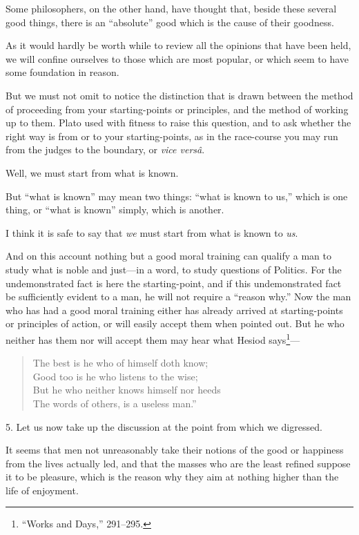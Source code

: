 Some philosophers, on the other hand, have thought that, beside these
several good things, there is an ``absolute'' good which is the cause
of their goodness.

As it would hardly be worth while to review all the opinions that have
been held, we will confine ourselves to those which are most popular,
or which seem to have some foundation in reason.

But we must not omit to notice the distinction that is drawn
between the method of proceeding from your starting-points or
principles, and the method of working up to them. Plato used with
fitness to raise this question, and to ask whether the right way is
from or to your starting-points, as in the race-course you may run
from the judges to the boundary, or \textit{vice vers\^a}.

Well, we must start from what is known.

But ``what is known'' may mean two things: ``what is known to us,''
which is one thing, or ``what is known'' simply, which is another.

I think it is safe to say that \textit{we} must start from what is
known to \textit{us}.

And on this account nothing but a good moral training can qualify a
man to study what is noble and just---in a word, to study questions of
Politics. For the undemonstrated fact is here the starting-point, and
if this undemonstrated fact be sufficiently evident to a man, he will
not require a ``reason why.'' Now the man who has had a good moral
training either has already arrived at starting-points or principles
of action, or will easily accept them when pointed out. But he who
neither has them nor will accept them may hear what Hesiod
says\footnote{``Works and Days,'' 291--295.}---

\begin{verse}
The best is he who of himself doth know;\\
Good too is he who listens to the wise;\\
But he who neither knows himself nor heeds\\
The words of others, is a useless man.''
\end{verse}

5. Let us now take up the discussion at the point from which we
digressed.

It seems that men not unreasonably take their notions of the
good or happiness from the lives actually led, and that the masses who
are the least refined suppose it to be pleasure, which is the reason
why they aim at nothing higher than the life of enjoyment.

